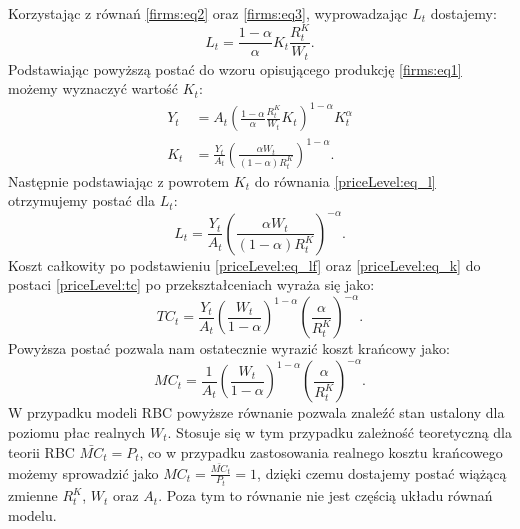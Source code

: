 Korzystając z równań \eqref{firms:eq2} oraz \eqref{firms:eq3}, wyprowadzając $L_t$ dostajemy:
\begin{equation}
    L_t = \frac{1-\alpha}{\alpha}K_t \frac{R^K_t}{W_t} \label{priceLevel:eq_l}.
\end{equation}
Podstawiając powyższą postać do wzoru opisującego produkcję \eqref{firms:eq1} możemy wyznaczyć wartość $K_t$:
\begin{align}
    Y_t &= A_t\left(\frac{1-\alpha}{\alpha}\frac{R^K_t}{W_t}K_t \right)^{1-\alpha}K_t^\alpha \\
    K_t &= \frac{Y_t}{A_t} \left( \frac{\alpha W_t}{(1-\alpha)R^K_t}\right)^{1-\alpha} \label{priceLevel:eq_k}.
\end{align}
Następnie podstawiając z powrotem $K_t$ do równania \eqref{priceLevel:eq_l} otrzymujemy postać dla $L_t$:
\begin{equation}
    L_t = \frac{Y_t}{A_t} \left( \frac{\alpha W_t}{(1-\alpha)R^K_t}\right)^{-\alpha}\label{priceLevel:eq_lf}.
\end{equation}
Koszt całkowity po podstawieniu \eqref{priceLevel:eq_lf} oraz \eqref{priceLevel:eq_k} do postaci \eqref{priceLevel:tc} po przekształceniach wyraża się jako:
\begin{equation}
    TC_t = \frac{Y_t}{A_t} \left( \frac{W_t}{1-\alpha} \right)^{1-\alpha} \left( \frac{\alpha}{R^K_t} \right)^{-\alpha}.
\end{equation}
Powyższa postać pozwala nam ostatecznie wyrazić koszt krańcowy jako:
\begin{equation}
    MC_t = \frac{1}{A_t} \left( \frac{W_t}{1-\alpha} \right)^{1-\alpha} \left( \frac{\alpha}{R^K_t} \right)^{-\alpha}.
\end{equation}
W przypadku modeli RBC powyższe równanie pozwala znaleźć stan ustalony dla poziomu płac realnych $W_t$. Stosuje się w tym przypadku zależność teoretyczną dla teorii RBC $\bar{MC}_t = P_t$, co w przypadku zastosowania realnego kosztu krańcowego możemy sprowadzić jako $MC_t = \frac{\bar{MC}_t}{P_t} = 1$, dzięki czemu dostajemy postać wiążącą zmienne $R^K_t$, $W_t$ oraz $A_t$. Poza tym to równanie nie jest częścią układu równań modelu.


